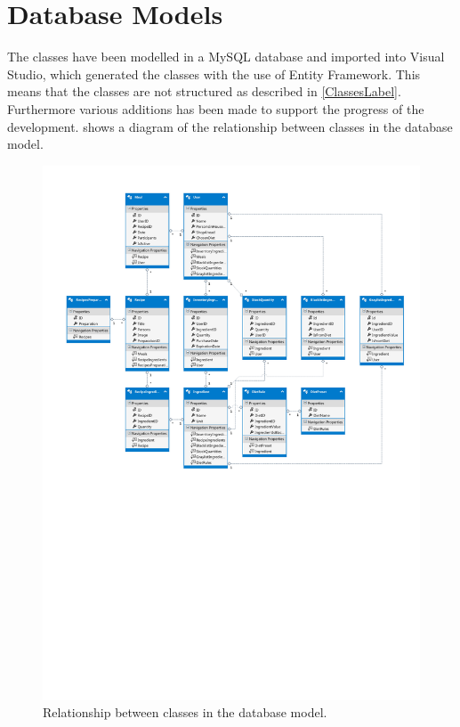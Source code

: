 \section{Database Models} \label{DataBaseModel/Classes}
The classes have been modelled in a MySQL database and imported into Visual Studio, which generated the classes with the use of Entity Framework. This means that the classes are not structured as described in \cref{ClassesLabel}. Furthermore various additions has been made to support the progress of the development.  shows a diagram of the relationship between classes in the database model.

\begin{figure}[H]
	\centering
    \includegraphics[width=1\textwidth, trim=0 350 0 0]{Grafik/FoodDatabase.pdf}
	\caption{Relationship between classes in the database model.}
	\label{DatabaseModel}
\end{figure}

